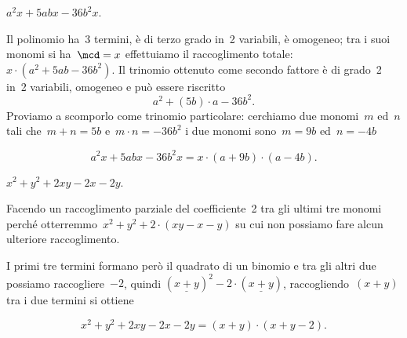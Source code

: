 % 
% 
% 
% 
% 
% 

 \begin{esempio}
 \(a^{2}x+5abx-36b^{2}x\).

Il polinomio ha~3 termini, è di terzo grado in~2 variabili, è omogeneo;
tra i suoi monomi si ha~\(\mcd= x\) effettuiamo il raccoglimento
totale:~\(x\cdot\left(a^{2}+5ab-36b^{2}\right)\).
Il trinomio ottenuto come secondo fattore è di grado~2 in~2 variabili,
omogeneo e può essere riscritto
\[a^{2}+\left(5b\right)\cdot a-36b^{2}.\]
Proviamo a scomporlo come trinomio particolare:
cerchiamo due monomi~\(m\) ed~\(n\) tali che~\(m+n=5b\)
e~\(m\cdot n=-36b^{2}\) i due monomi sono~\(m=9b\)
ed~\(n=-4b\)

\[a^{2}x+5abx-36b^{2}x=x\cdot\left(a+9b\right)\cdot \left(a-4b\right).\]
 \end{esempio}

 \begin{esempio}
 \(x^{2}+y^{2}+2xy-2x-2y\).

Facendo un raccoglimento parziale del coefficiente~2 tra gli ultimi tre monomi 
perché otterremmo~\(x^{2}+y^{2}+2\cdot\left(xy-x-y\right)\) su cui non possiamo
fare alcun ulteriore raccoglimento.

I primi tre termini formano però il quadrato di un binomio e tra gli
altri due possiamo raccogliere~\(-2\), quindi
\(\left(\underline{{x+y}}\right)^{2}-2\cdot\left(\underline{{x+y}}\right)\),
raccogliendo~\((x + y)\) tra i due termini si ottiene

\begin{equation*}
x^{2}+y^{2}+2xy-2x-2y=\left(x+y\right)\cdot \left(x+y-2\right).
\end{equation*}
 \end{esempio}


